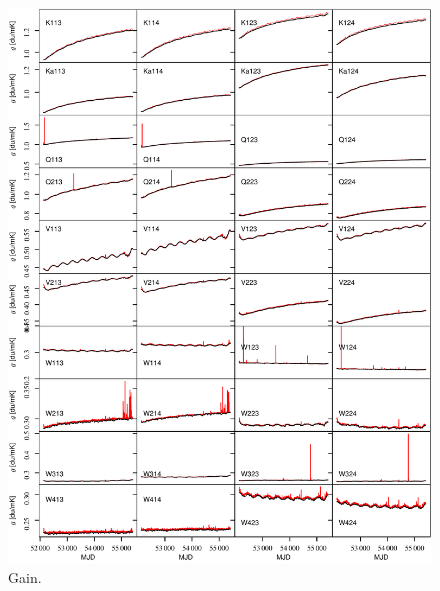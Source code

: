 \documentclass[twocolumn]{../../common/aa}
\begin{document}
\begin{figure}[p]
  	\centering
	\includegraphics[width=\textwidth]{figures/instpar_CG_gain_v1.pdf}
	\caption{Gain.}
	\label{fig:gain}
\end{figure}
\end{document}
